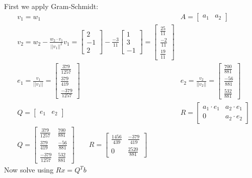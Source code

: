 \documentclass[10pt,letterpaper]{article}
\begin{document}
	First we apply Gram-Schmidt: 
	\begin{align*}
	& v_1 = w_1 & A = \begin{bmatrix}
	a_1 & a_2
	\end{bmatrix} \\ 
	& v_2 = w_2 - \frac{w_2 \cdot v_1}{||v_1||^2}v_1 = \begin{bmatrix}
	2 \\ -1 \\ 2
	\end{bmatrix} - \frac{-3}{11} \begin{bmatrix}
	1 \\ 3 \\ -1
	\end{bmatrix} = \begin{bmatrix}
	\frac{25}{11} \\ \frac{-2}{11} \\ \frac{19}{11}
	\end{bmatrix} \\ 
	& e_1 = \frac{v_1}{||v_1||} = \begin{bmatrix}
	\frac{379}{1257} \\ \frac{379}{419} \\ \frac{-379}{1257}
	\end{bmatrix} & e_2 = \frac{v_2}{||v_2||} = \begin{bmatrix}
	\frac{700}{881} \\ \frac{-56}{881} \\ \frac{532}{881}
	\end{bmatrix} \\ 
	& Q = \begin{bmatrix}
	e_1 & e_2
	\end{bmatrix} & R = \begin{bmatrix}
	a_1 \cdot e_1 & a_2 \cdot e_1 \\ 0 & a_2 \cdot e_2
	\end{bmatrix} \\ 
	& Q = \begin{bmatrix}
		\frac{379}{1257} & 	\frac{700}{881} \\ \frac{379}{419} & \frac{-56}{881} \\ \frac{-379}{1257} & \frac{532}{881}
		\end{bmatrix} \qquad R = \begin{bmatrix}
		\frac{1456}{439} & \frac{-379}{419} \\ 0 & \frac{2520}{881}
		\end{bmatrix}
	\end{align*} 
	Now solve using $Rx = Q^Tb$ 
	
\end{document}
